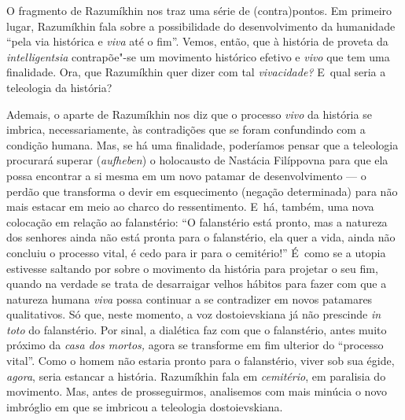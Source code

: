 O fragmento de Razumíkhin nos traz uma série de (contra)pontos. Em
primeiro lugar, Razumíkhin fala sobre a possibilidade do desenvolvimento
da humanidade ``pela via histórica e \emph{viva} até o fim''. Vemos,
então, que à história de proveta da \emph{intelligentsia} contrapõe"-se
um movimento histórico efetivo e \emph{vivo} que tem uma finalidade.
Ora, que Razumíkhin quer dizer com tal \emph{vivacidade?} E~qual seria a
teleologia da história?

Ademais, o aparte de Razumíkhin nos diz que o processo \emph{vivo} da
história se imbrica, necessariamente, às contradições que se foram
confundindo com a condição humana. Mas, se há uma finalidade, poderíamos
pensar que a teleologia procurará superar (\emph{aufheben}) o holocausto
de Nastácia Filíppovna para que ela possa encontrar a si mesma em um
novo patamar de desenvolvimento --- o perdão que transforma o devir em
esquecimento (negação determinada) para não mais estacar em meio ao
charco do ressentimento. E~há, também, uma nova colocação em relação ao
falanstério: ``O falanstério está pronto, mas a natureza dos senhores
ainda não está pronta para o falanstério, ela quer a vida, ainda não
concluiu o processo vital, é cedo para ir para o cemitério!'' É~como se
a utopia estivesse saltando por sobre o movimento da história para
projetar o seu fim, quando na verdade se trata de desarraigar velhos
hábitos para fazer com que a natureza humana \emph{viva} possa continuar
a se contradizer em novos patamares qualitativos. Só que, neste momento,
a voz dostoievskiana já não prescinde \emph{in toto} do falanstério. Por
sinal, a dialética faz com que o falanstério, antes muito próximo da
\emph{casa dos mortos,} agora se transforme em fim ulterior do
``processo vital''. Como o homem não estaria pronto para o falanstério,
viver sob sua égide, \emph{agora}, seria estancar a história. Razumíkhin
fala em \emph{cemitério}, em paralisia do movimento. Mas, antes de
prosseguirmos, analisemos com mais minúcia o novo imbróglio em que se
imbricou a teleologia dostoievskiana.

